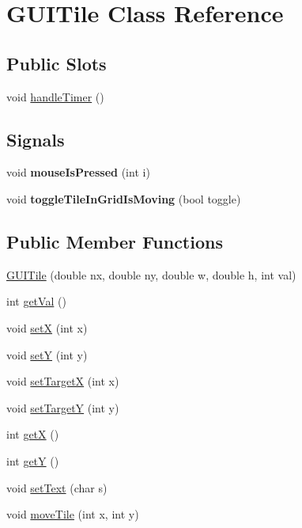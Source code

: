 \hypertarget{classGUITile}{\section{\-G\-U\-I\-Tile \-Class \-Reference}
\label{classGUITile}
}
\subsection*{\-Public \-Slots}
\begin{DoxyCompactItemize}
\item 
void \hyperlink{classGUITile_a27a1cce7b5fd28fd33eb48de037c4c95}{handle\-Timer} ()
\end{DoxyCompactItemize}
\subsection*{\-Signals}
\begin{DoxyCompactItemize}
\item 
\hypertarget{classGUITile_a89ff7c31a4bb69a4bda4173b74e28c65}{void {\bfseries mouse\-Is\-Pressed} (int i)}\label{classGUITile_a89ff7c31a4bb69a4bda4173b74e28c65}

\item 
\hypertarget{classGUITile_a13412c999c62fd22a078a55912ba9b2f}{void {\bfseries toggle\-Tile\-In\-Grid\-Is\-Moving} (bool toggle)}\label{classGUITile_a13412c999c62fd22a078a55912ba9b2f}

\end{DoxyCompactItemize}
\subsection*{\-Public \-Member \-Functions}
\begin{DoxyCompactItemize}
\item 
\hyperlink{classGUITile_a2f68bab3f42c100659c5511caca1f6d0}{\-G\-U\-I\-Tile} (double nx, double ny, double w, double h, int val)
\item 
int \hyperlink{classGUITile_a6a9f8ca623dd71a0cdac32079597700d}{get\-Val} ()
\item 
void \hyperlink{classGUITile_a8cc874722eaec0956ffc0e69a72b04d9}{set\-X} (int x)
\item 
void \hyperlink{classGUITile_a07fb5eb83771d7ade19222e8e24c461b}{set\-Y} (int y)
\item 
void \hyperlink{classGUITile_a2c968a87617bd18ae9b8aa4d234aad88}{set\-Target\-X} (int x)
\item 
void \hyperlink{classGUITile_a95f89fcf6d7b4fb525b5b27b333c069b}{set\-Target\-Y} (int y)
\item 
int \hyperlink{classGUITile_aa9bb3eaa1bcfe6032805593db8fb0a86}{get\-X} ()
\item 
int \hyperlink{classGUITile_a22c037d69a48973ea0f71caa65a28f4a}{get\-Y} ()
\item 
void \hyperlink{classGUITile_aadaa7af395e9a3ac1cd8e0ec53508ba7}{set\-Text} (char s)
\item 
void \hyperlink{classGUITile_a5e2f783dd43773bbb0f2fde2d5f7129d}{move\-Tile} (int x, int y)
\end{DoxyCompactItemize}
